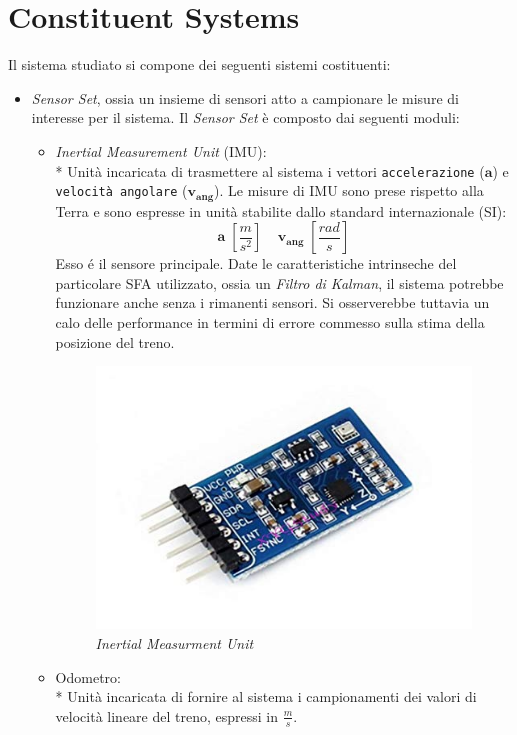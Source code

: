 \section{Constituent Systems}
Il sistema studiato si compone dei seguenti sistemi costituenti:
\begin{itemize}
	\item \emph{Sensor Set}, ossia un insieme di sensori atto a campionare le misure di interesse per il sistema. Il \emph{Sensor Set} \`e composto dai seguenti moduli:
	\begin{itemize}
		\item \emph{Inertial Measurement Unit} (IMU):\\*
		Unit\`a incaricata di trasmettere al sistema i vettori \texttt{accelerazione} ($\mathbf{a}$) e \texttt{velocit\`a angolare} ($\mathbf{v_{ang}}$). Le misure di IMU sono prese rispetto alla Terra e sono espresse in unit\`a stabilite dallo standard internazionale (SI):
		$$
		\mathbf{a}\;\left[\frac{m}{s^2}\right]\;\;\;\;\mathbf{v_{ang}}\;\left[ \frac{rad}{s} \right]
		$$
		Esso \'e il sensore principale. Date le caratteristiche intrinseche del particolare SFA utilizzato, ossia un \emph{Filtro di Kalman}, il sistema potrebbe funzionare anche senza i rimanenti sensori. Si osserverebbe tuttavia un calo delle performance in termini di errore commesso sulla stima della posizione del treno. \cite{partialmeas} \cite{gpsdarkarea}
		\begin{figure}[h]
			\centering
			\includegraphics[scale=0.5]{img/imu}
			\caption{\emph{Inertial Measurment Unit}}
			\label{fig:imu}
		\end{figure}
		\item Odometro:\\*
		Unit\`a incaricata di fornire al sistema i campionamenti dei valori di velocit\`a lineare del treno, espressi in $\frac{m}{s}$.

\end{itemize}
\end{itemize}
